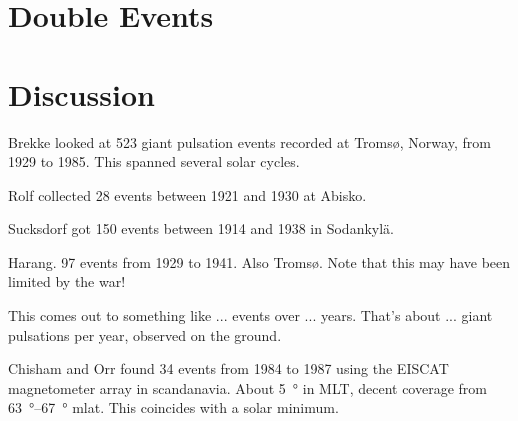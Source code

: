 \section{Double Events}
  \label{sec_double}

\todo{$\cdots$}



\section{Discussion}

\todo{$\cdots$}






Brekke\cite{brekke_1987} looked at 523 giant pulsation events recorded at Troms{\o}, Norway, from 1929 to 1985. This spanned several solar cycles. 

Rolf\cite{rolf_1931} collected 28 events between 1921 and 1930 at Abisko. 

Sucksdorf\cite{sucksdorff_1939} got 150 events between 1914 and 1938 in Sodankyl{\"a}. 

Harang\cite{harang_1941}. 97 events from 1929 to 1941. Also Troms{\o}. Note that this may have been limited by the war! 

This comes out to something like ... events over ... years. That's about ... giant pulsations per year, observed on the ground. 


Chisham and Orr\cite{chisham_1991} found 34 events from 1984 to 1987 using the EISCAT magnetometer array in scandanavia. About \SI{5}{\degree} in MLT, decent coverage from \SIrange{63}{67}{\degree} mlat. This coincides with a solar minimum. 

